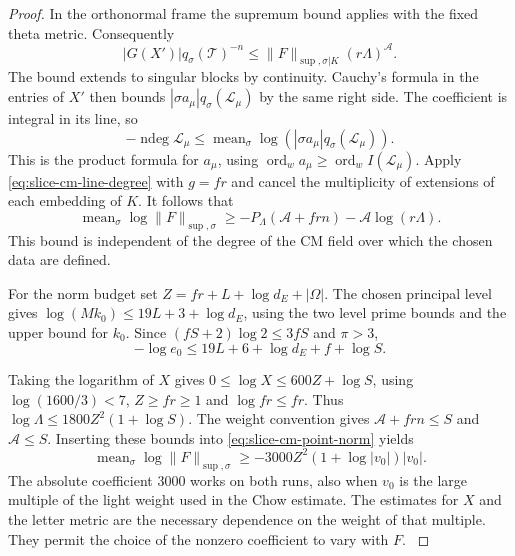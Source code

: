 \begin{proof}
In the orthonormal frame the supremum
bound applies with the fixed theta metric. Consequently
\[
 |G(X')|q_\sigma(\mathcal T)^{-n}
    \le \|F\|_{\sup,\sigma|K}(r\Lambda)^{\mathcal A}.
\]
The bound extends to singular blocks by continuity.
Cauchy's formula in the entries of \(X'\) then bounds
\(|\sigma a_\mu|q_\sigma(\mathcal L_\mu)\) by the same
right side. The coefficient is integral in its line, so
\[
 -\operatorname{ndeg}\mathcal L_\mu
       \le \operatorname{mean}_\sigma
                      \log(|\sigma a_\mu|q_\sigma(\mathcal L_\mu)).
\]
This is the product formula for \(a_\mu\), using
\(\operatorname{ord}_w a_\mu\ge\operatorname{ord}_w I(\mathcal L_\mu)\).
Apply \eqref{eq:slice-cm-line-degree} with \(g=fr\) and
cancel the multiplicity of extensions of each embedding of
\(K\). It follows that
\begin{equation}\label{eq:slice-cm-point-norm}
  \operatorname{mean}_\sigma\log\|F\|_{\sup,\sigma}
       \ge -P_\Lambda(\mathcal A+frn)
                   -\mathcal A\log(r\Lambda).
\end{equation}
This bound is independent of the degree of the CM field over which the chosen data are defined.

For the norm budget set \(Z=fr+L+\log d_E+|\Omega|\).
The chosen principal level gives
\(\log(Mk_0)\le 19L+3+\log d_E\), using the two level
prime bounds and the upper bound for \(k_0\).
Since \((fS+2)\log2\le 3fS\) and \(\pi>3\),
\[
 -\log e_0\le 19L+6+\log d_E+f+\log S .
\]

Taking the logarithm of \(X\) gives
\(0\le\log X\le600 Z+\log S\), using
\(\log(1600/3)<7\), \(Z\ge fr\ge1\) and
\(\log fr\le fr\). Thus
\(\log\Lambda\le1800 Z^2(1+\log S)\).
The weight convention gives
\(\mathcal A+frn\le S\) and \(\mathcal A\le S\).
Inserting these bounds into \eqref{eq:slice-cm-point-norm}
yields
\begin{equation}\label{eq:slice-integral-norm}
        \operatorname{mean}_\sigma\log\|F\|_{\sup,\sigma}
                    \ge -3000 Z^2(1+\log |v_0|)|v_0|.
\end{equation}
The absolute coefficient \(3000\) works on both runs,
also when \(v_0\) is the large multiple of the light weight
used in the Chow estimate. The estimates for \(X\) and the
letter metric are the necessary dependence on the weight
of that multiple. They permit the choice of the nonzero
coefficient to vary with \(F\).
\label{cor:slice-integral-norm-7}
\end{proof}

